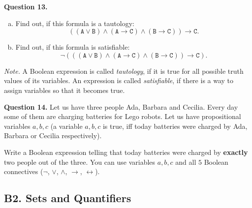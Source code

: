 \documentclass[jou]{apa6}
\begin{document}
\vspace{6pt}
{\bf Question 13.} 
\begin{enumerate}[(a)]
\item Find out, if this formula is a tautology: 
$$\mathtt{((A \vee B) \wedge (A \rightarrow C) \wedge 
(B \rightarrow C)) \rightarrow C}.$$
\item Find out, if this formula is satisfiable: 
$$\mathtt{\neg (((A \vee B) \wedge (A \rightarrow C) \wedge 
(B \rightarrow C)) \rightarrow C)}.$$
\end{enumerate}

{\em Note.} A Boolean expression is called {\em tautology}, 
if it is true for all 
possible truth values of its variables. 
An expression is called {\em satisfiable}, 
if there is a way to assign 
variables so that it becomes true. 

\vspace{6pt}
{\bf Question 14.} 
Let us have three people \textendash{} Ada, Barbara and Cecilia. 
Every day some of them are charging batteries for Lego robots.
Let us have propositional variables $a,b,c$ (a variable $a,b,c$ is true, iff 
today batteries were charged by Ada, Barbara or Cecilia respectively). 

Write a Boolean expression telling that today batteries were charged
by {\bf exactly} two people out of the three. You can use variables $a,b,c$ and
all $5$ Boolean connectives ($\neg$, $\vee$, $\wedge$, $\rightarrow$, 
$\leftrightarrow$). 



\subsection{B2. Sets and Quantifiers}
\end{document}
